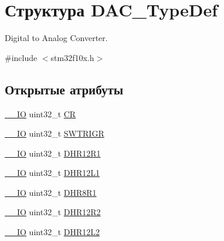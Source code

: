 \hypertarget{struct_d_a_c___type_def}{}\section{Структура D\+A\+C\+\_\+\+Type\+Def}
\label{struct_d_a_c___type_def}


Digital to Analog Converter.  




{\ttfamily \#include $<$stm32f10x.\+h$>$}

\subsection*{Открытые атрибуты}
\begin{DoxyCompactItemize}
\item 
\mbox{\hyperlink{group___c_m_s_i_s___c_m3__core__definitions_gaec43007d9998a0a0e01faede4133d6be}{\+\_\+\+\_\+\+IO}} uint32\+\_\+t \mbox{\hyperlink{struct_d_a_c___type_def_a394324f0b573837ca15a87127b2a37ea}{CR}}
\item 
\mbox{\hyperlink{group___c_m_s_i_s___c_m3__core__definitions_gaec43007d9998a0a0e01faede4133d6be}{\+\_\+\+\_\+\+IO}} uint32\+\_\+t \mbox{\hyperlink{struct_d_a_c___type_def_a4ccb66068a1ebee1179574dda20206b6}{S\+W\+T\+R\+I\+GR}}
\item 
\mbox{\hyperlink{group___c_m_s_i_s___c_m3__core__definitions_gaec43007d9998a0a0e01faede4133d6be}{\+\_\+\+\_\+\+IO}} uint32\+\_\+t \mbox{\hyperlink{struct_d_a_c___type_def_afbfd2855cdb81939b4efc58e08aaf3e5}{D\+H\+R12\+R1}}
\item 
\mbox{\hyperlink{group___c_m_s_i_s___c_m3__core__definitions_gaec43007d9998a0a0e01faede4133d6be}{\+\_\+\+\_\+\+IO}} uint32\+\_\+t \mbox{\hyperlink{struct_d_a_c___type_def_a5eb63912e39085e3e13d64bdb0cf38bd}{D\+H\+R12\+L1}}
\item 
\mbox{\hyperlink{group___c_m_s_i_s___c_m3__core__definitions_gaec43007d9998a0a0e01faede4133d6be}{\+\_\+\+\_\+\+IO}} uint32\+\_\+t \mbox{\hyperlink{struct_d_a_c___type_def_a3a382d341fb608a04390bacb8c00b0f0}{D\+H\+R8\+R1}}
\item 
\mbox{\hyperlink{group___c_m_s_i_s___c_m3__core__definitions_gaec43007d9998a0a0e01faede4133d6be}{\+\_\+\+\_\+\+IO}} uint32\+\_\+t \mbox{\hyperlink{struct_d_a_c___type_def_ab1f777540c487c26bf27e6fa37a644cc}{D\+H\+R12\+R2}}
\item 
\mbox{\hyperlink{group___c_m_s_i_s___c_m3__core__definitions_gaec43007d9998a0a0e01faede4133d6be}{\+\_\+\+\_\+\+IO}} uint32\+\_\+t \mbox{\hyperlink{struct_d_a_c___type_def_a9f612b6b3e065e810e5a2fb254d6a40b}{D\+H\+R12\+L2}}

\end{DoxyCompactItemize}
